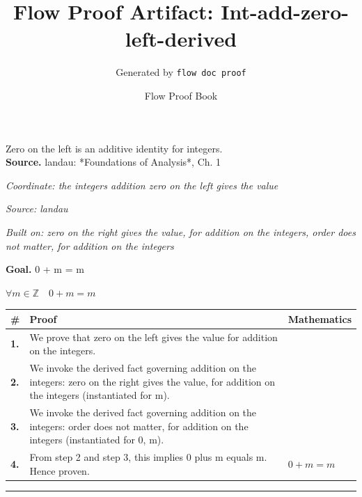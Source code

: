 \documentclass[11pt]{article}
\title{Flow Proof Artifact: Int-add-zero-left-derived}
\author{Generated by \texttt{flow doc proof}}
\date{Flow Proof Book}
\theoremstyle{definition}
\begin{document}
\maketitle
Zero on the left is an additive identity for integers.\\[0.5em]
\textbf{Source.} landau: *Foundations of Analysis*, Ch. 1\\[0.5em]
\bigskip
{}\par
\smallskip\noindent\textit{Coordinate: the integers \cdot addition \cdot zero on the left gives the value}\par
\smallskip\noindent\textit{Source: landau}\par
\smallskip\noindent\textit{Built on: zero on the right gives the value, for addition on the integers, order does not matter, for addition on the integers}\par
\medskip
\noindent\textbf{Goal.} 0 + m = m\par
\noindent$\displaystyle \forall m \in \mathbb{Z}\quad 0 + m = m$\par
\medskip
\noindent
\begin{tabular}{@{} >{\raggedright\arraybackslash}p{} >{\raggedright\arraybackslash}p{} >{\raggedleft\arraybackslash}p{} @{}}
\textbf{\#} & \textbf{Proof} & \textbf{Mathematics} \\
\midrule
\textbf{1.} & We prove that zero on the left gives the value for addition on the integers. & \\[0.45em]
\textbf{2.} & We invoke the derived fact governing addition on the integers: zero on the right gives the value, for addition on the integers (instantiated for m). & \\[0.45em]
\textbf{3.} & We invoke the derived fact governing addition on the integers: order does not matter, for addition on the integers (instantiated for 0, m). & \\[0.45em]
\textbf{4.} & From step 2 and step 3, this implies 0 plus m equals m. Hence proven. & $\displaystyle 0 + m = m$ \\[0.45em]
\bottomrule
\end{tabular}
\label{thm:Int-addition-zero_on_the_left_gives_the_value}
\par\medskip\hrule
\end{document}
